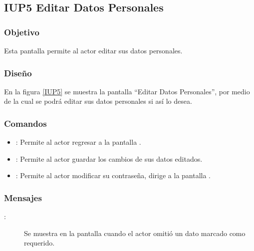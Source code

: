 \subsection{IUP5 Editar Datos Personales}
 
\subsubsection{Objetivo}

    Esta pantalla permite al actor editar sus datos personales.

\subsubsection{Diseño}

    En la figura \ref{IUP5} se muestra la pantalla ``Editar Datos Personales'', por medio de la cual se podrá editar sus datos personales si así lo desea. \\


\subsubsection{Comandos}
\begin{itemize}
    \item {}: Permite al actor regresar a la pantalla .
    \item {}: Permite al actor guardar los cambios de sus datos editados.
    \item {}: Permite al actor modificar su contraseña, dirige a la pantalla .
\end{itemize}

\subsubsection{Mensajes}

\begin{description}
    \item[:] Se muestra en la pantalla  cuando el actor omitió un dato marcado como requerido.
\end{description}
